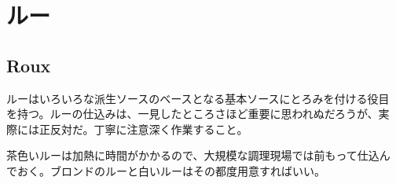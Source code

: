 \hypertarget{ux30ebux30fc}{%
\section{ルー}\label{ux30ebux30fc}}

\hypertarget{roux}{%
\subsection{Roux}\label{roux}}

 

ルーはいろいろな派生ソースのベースとなる基本ソースにとろみを付ける役目
を持つ。ルーの仕込みは、一見したところさほど重要に思われぬだろうが、実
際には正反対だ。丁寧に注意深く作業すること。

茶色いルーは加熱に時間がかかるので、大規模な調理現場では前もって仕込ん
でおく。ブロンドのルーと白いルーはその都度用意すればいい。

